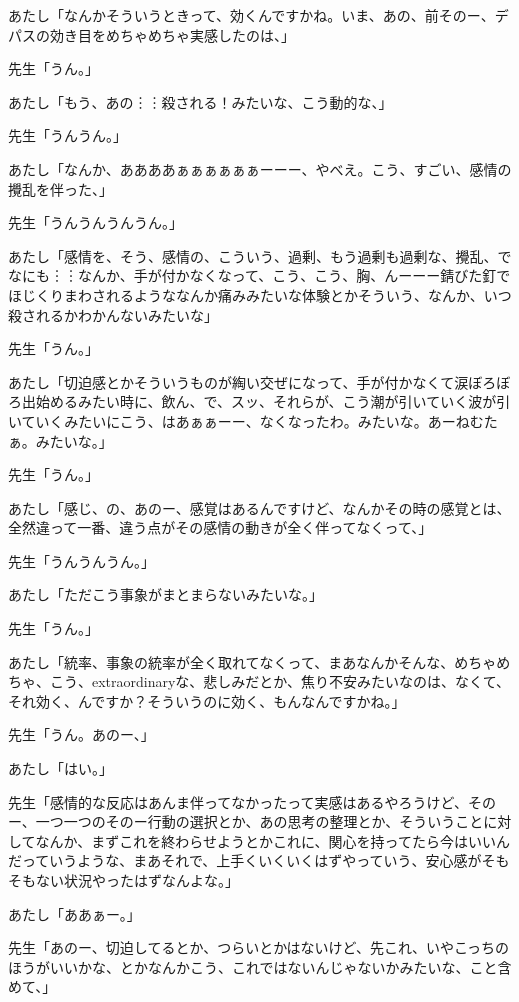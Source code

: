 \documentclass[b5j,twoside,twocolumn]{utarticle}
\begin{document}
\begin{description}
\item あたし「なんかそういうときって、効くんですかね。いま、あの、前そのー、デパスの効き目をめちゃめちゃ実感したのは、」
\item 先生「うん。」
\item あたし「もう、あの︙︙殺される！みたいな、こう動的な、」
\item 先生「うんうん。」
\item あたし「なんか、ああああぁぁぁぁぁぁーーー、やべえ。こう、すごい、感情の攪乱を伴った、」
\item 先生「うんうんうんうん。」
\item あたし「感情を、そう、感情の、こういう、過剰、もう過剰も過剰な、攪乱、でなにも︙︙なんか、手が付かなくなって、こう、こう、胸、んーーー錆びた釘でほじくりまわされるようななんか痛みみたいな体験とかそういう、なんか、いつ殺されるかわかんないみたいな」
\item 先生「うん。」
\item あたし「切迫感とかそういうものが綯い交ぜになって、手が付かなくて涙ぼろぼろ出始めるみたい時に、飲ん、で、スッ、それらが、こう潮が引いていく波が引いていくみたいにこう、はあぁぁーー、なくなったわ。みたいな。あーねむたぁ。みたいな。」
\item 先生「うん。」
\item あたし「感じ、の、あのー、感覚はあるんですけど、なんかその時の感覚とは、全然違って一番、違う点がその感情の動きが全く伴ってなくって、」
\item 先生「うんうんうん。」
\item あたし「ただこう事象がまとまらないみたいな。」
\item 先生「うん。」
\item あたし「統率、事象の統率が全く取れてなくって、まあなんかそんな、めちゃめちゃ、こう、extraordinaryな、悲しみだとか、焦り不安みたいなのは、なくて、それ効く、んですか？そういうのに効く、もんなんですかね。」
\item 先生「うん。あのー、」
\item あたし「はい。」
\item 先生「感情的な反応はあんま伴ってなかったって実感はあるやろうけど、そのー、一つ一つのそのー行動の選択とか、あの思考の整理とか、そういうことに対してなんか、まずこれを終わらせようとかこれに、関心を持ってたら今はいいんだっていうような、まあそれで、上手くいくいくはずやっていう、安心感がそもそもない状況やったはずなんよな。」
\item あたし「ああぁー。」
\item 先生「あのー、切迫してるとか、つらいとかはないけど、先これ、いやこっちのほうがいいかな、とかなんかこう、これではないんじゃないかみたいな、こと含めて、」

\end{description}
\end{document}
